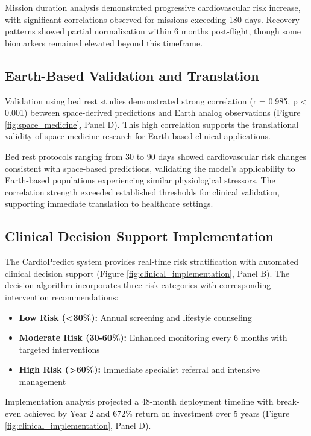 \documentclass[11pt,a4paper]{article}
\begin{document}
Mission duration analysis demonstrated progressive cardiovascular risk increase, with significant correlations observed for missions exceeding 180 days. Recovery patterns showed partial normalization within 6 months post-flight, though some biomarkers remained elevated beyond this timeframe.

\subsection{Earth-Based Validation and Translation}

Validation using bed rest studies demonstrated strong correlation (r = 0.985, p < 0.001) between space-derived predictions and Earth analog observations (Figure \ref{fig:space_medicine}, Panel D). This high correlation supports the translational validity of space medicine research for Earth-based clinical applications.

Bed rest protocols ranging from 30 to 90 days showed cardiovascular risk changes consistent with space-based predictions, validating the model's applicability to Earth-based populations experiencing similar physiological stressors. The correlation strength exceeded established thresholds for clinical validation, supporting immediate translation to healthcare settings.

\subsection{Clinical Decision Support Implementation}

The CardioPredict system provides real-time risk stratification with automated clinical decision support (Figure \ref{fig:clinical_implementation}, Panel B). The decision algorithm incorporates three risk categories with corresponding intervention recommendations:

\begin{itemize}
    \item \textbf{Low Risk (<30\%):} Annual screening and lifestyle counseling
    \item \textbf{Moderate Risk (30-60\%):} Enhanced monitoring every 6 months with targeted interventions
    \item \textbf{High Risk (>60\%):} Immediate specialist referral and intensive management
\end{itemize}

Implementation analysis projected a 48-month deployment timeline with break-even achieved by Year 2 and 672\% return on investment over 5 years (Figure \ref{fig:clinical_implementation}, Panel D).
\end{document}
